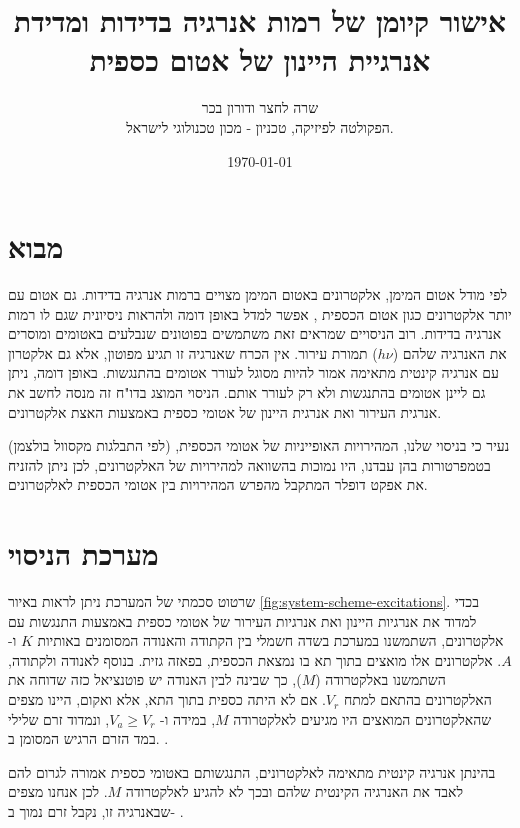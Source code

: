 \documentclass{article}
\title{
אישור קיומן של רמות אנרגיה בדידות ומדידת אנרגיית היינון של אטום כספית
}
\author{
שרה לחצר ודורון בכר \\
הפקולטה לפיזיקה, טכניון - מכון טכנולוגי לישראל.
}
\date{\today}
\newcommand*\circled[1]{\tikz[baseline=(char.base)]{
		            \node[shape=circle,draw,inner sep=1pt] (char) {#1};}}
\begin{document}
\maketitle

\begin{abstract}
\end{abstract}

\section{מבוא}

לפי מודל אטום המימן, אלקטרונים באטום המימן מצויים ברמות אנרגיה בדידות. גם אטום
עם יותר אלקטרונים כגון אטום הכספית , אפשר למדל באופן דומה ולהראות
ניסיונית שגם לו רמות אנרגיה בדידות. רוב הניסויים שמראים זאת משתמשים בפוטונים
שנבלעים באטומים ומוסרים את האנרגיה שלהם
($h \nu $)
תמורת עירור. אין הכרח
שאנרגיה זו תגיע מפוטון, אלא גם אלקטרון עם אנרגיה קינטית מתאימה אמור להיות
מסוגל לעורר אטומים בהתנגשות. באופן דומה, ניתן גם ליינן אטומים בהתנגשות ולא רק
לעורר אותם.
הניסוי המוצג בדו"ח זה מנסה לחשב את אנרגית העירור ואת אנרגית היינון של אטומי כספית באמצעות האצת אלקטרונים. 

נעיר כי בניסוי שלנו, המהירויות האופייניות של אטומי הכספית, (לפי התבלגות מקסוול בולצמן) בטמפרטורות בהן עבדנו, היו נמוכות בהשוואה למהירויות של האלקטרונים, לכן ניתן להזניח את אפקט דופלר המתקבל מהפרש המהירויות בין אטומי הכספית לאלקטרונים.


\section{מערכת הניסוי}

שרטוט סכמתי של המערכת ניתן לראות באיור
\ref{fig:system-scheme-excitations}.
בכדי למדוד את אנרגיות היינון ואת אנרגיות העירור של אטומי כספית באמצעות התנגשות
עם אלקטרונים, השתמשנו במערכת בשדה חשמלי בין הקתודה והאנודה המסומנים באותיות
$K$
ו-
$A$.
אלקטרונים אלו מואצים בתוך תא בו נמצאת הכספית, בפאזה גזית. בנוסף לאנודה
ולקתודה, השתמשנו באלקטרודה 
($M$),
כך שבינה לבין האנודה יש פוטנציאל כזה שדוחה את
האלקטרונים בהתאם למתח
$V_r$.
אם לא היתה כספית בתוך התא, אלא ואקום, היינו מצפים
שהאלקטרונים המואצים היו מגיעים לאלקטרודה
$M$,
במידה ו-
$V_a \ge  V_r$,
ונמדוד
זרם שלילי במד הזרם הרגיש המסומן ב.
\circled{pA}.

בהינתן אנרגיה קינטית מתאימה לאלקטרונים, התנגשותם באטומי כספית אמורה לגרום להם
לאבד את האנרגיה הקינטית שלהם ובכך לא להגיע לאלקטרודה $M$. לכן אנחנו מצפים
שבאנרגיה זו, נקבל זרם נמוך ב-
\circled{pA}.
\end{document}
